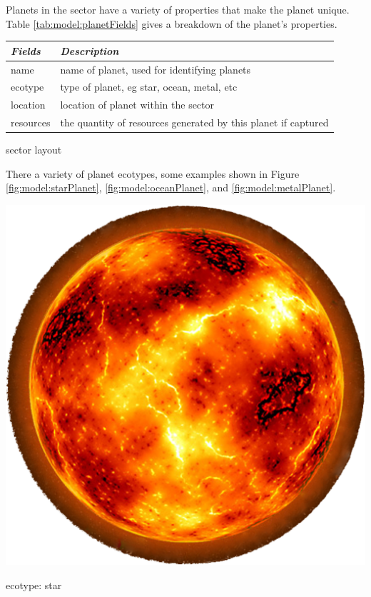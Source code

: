 Planets in the sector have a variety of properties that make the planet unique.
Table \ref{tab:model:planetFields} gives a breakdown of the planet's properties.

\begin{margintable}
    \begin{tabular}{p{3em} p{9em}}
    \toprule
    \emph{Fields} & \emph{Description} \\
    \midrule
    name & name of planet, used for identifying planets \\
    ecotype & type of planet, eg star, ocean, metal, etc \\
    location & location of planet within the sector \\
    resources & the quantity of resources generated by this planet if captured\\
    \bottomrule
    \end{tabular}
    	\vspace{1em}
	\caption{sector layout}
	\label{tab:model:planetFields}
\end{margintable}

There a variety of planet ecotypes, some examples shown in Figure \ref{fig:model:starPlanet}, \ref{fig:model:oceanPlanet}, and \ref{fig:model:metalPlanet}.


\begin{marginfigure}
	\includegraphics{res/planets/star.png}
	\caption{ecotype: star}
	\label{fig:model:starPlanet}
\end{marginfigure}

